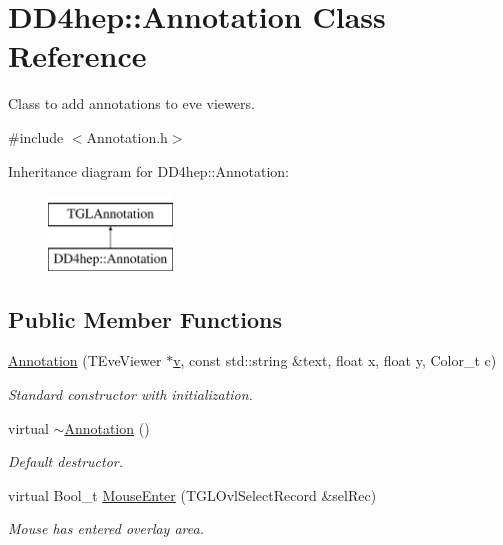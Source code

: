 \hypertarget{class_d_d4hep_1_1_annotation}{}\section{D\+D4hep\+:\+:Annotation Class Reference}
\label{class_d_d4hep_1_1_annotation}


Class to add annotations to eve viewers.  




{\ttfamily \#include $<$Annotation.\+h$>$}

Inheritance diagram for D\+D4hep\+:\+:Annotation\+:\begin{figure}[H]
\begin{center}
\leavevmode
\includegraphics[height=2.000000cm]{class_d_d4hep_1_1_annotation}
\end{center}
\end{figure}
\subsection*{Public Member Functions}
\begin{DoxyCompactItemize}
\item 
\hyperlink{class_d_d4hep_1_1_annotation_a8b1b5f5ca85400bf6f580a91f6e7cebc}{Annotation} (T\+Eve\+Viewer $\ast$\hyperlink{_multi_view_8cpp_a8320ee13ac034dbf6d624fe8953dd337}{v}, const std\+::string \&text, float x, float y, Color\+\_\+t c)
\begin{DoxyCompactList}\small\item\em Standard constructor with initialization. \end{DoxyCompactList}\item 
virtual \hyperlink{class_d_d4hep_1_1_annotation_a95144855eb445040d47951c668dc5764}{$\sim$\+Annotation} ()
\begin{DoxyCompactList}\small\item\em Default destructor. \end{DoxyCompactList}\item 
virtual Bool\+\_\+t \hyperlink{class_d_d4hep_1_1_annotation_a08d3cc154321a9410f62e38d42a918f0}{Mouse\+Enter} (T\+G\+L\+Ovl\+Select\+Record \&sel\+Rec)
\begin{DoxyCompactList}\small\item\em Mouse has entered overlay area. \end{DoxyCompactList}\end{DoxyCompactItemize}
